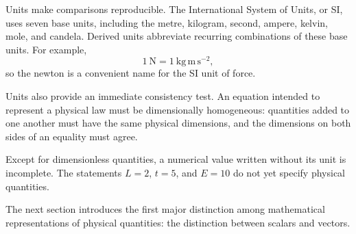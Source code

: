 Units make comparisons reproducible. The International System of Units, or SI,
uses seven base units, including the metre, kilogram, second, ampere, kelvin,
mole, and candela. Derived units abbreviate recurring combinations of these
base units. For example,
\[
1\ \mathrm{N}=1\ \mathrm{kg\,m\,s^{-2}},
\]
so the newton is a convenient name for the SI unit of force.

Units also provide an immediate consistency test. An equation intended to
represent a physical law must be dimensionally homogeneous: quantities added to
one another must have the same physical dimensions, and the dimensions on both
sides of an equality must agree.

\begin{bookwarning}
Except for dimensionless quantities, a numerical value written without its unit
is incomplete. The statements $L=2$, $t=5$, and $E=10$ do not yet specify
physical quantities.
\end{bookwarning}

The next section introduces the first major distinction among mathematical
representations of physical quantities: the distinction between scalars and
vectors.
